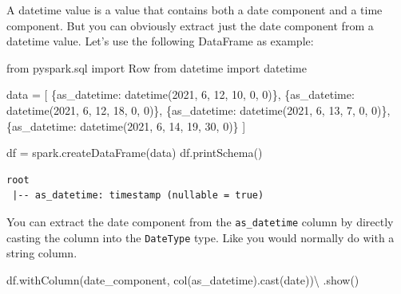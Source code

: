 \documentclass[
  11pt,
  letterpaper,
  DIV=11,
  numbers=noendperiod]{scrreprt}
\newenvironment{Shaded}{\begin{snugshade}}{\end{snugshade}}
\newcommand{\DecValTok}[1]{\textcolor[rgb]{0.68,0.00,0.00}{#1}}
\newcommand{\ImportTok}[1]{\textcolor[rgb]{0.00,0.46,0.62}{#1}}
\newcommand{\NormalTok}[1]{\textcolor[rgb]{0.00,0.23,0.31}{#1}}
\newcommand{\OperatorTok}[1]{\textcolor[rgb]{0.37,0.37,0.37}{#1}}
\newcommand{\StringTok}[1]{\textcolor[rgb]{0.13,0.47,0.30}{#1}}
\begin{document}
A datetime value is a value that contains both a date component and a
time component. But you can obviously extract just the date component
from a datetime value. Let's use the following DataFrame as example:

\begin{Shaded}
\begin{Highlighting}[]
\ImportTok{from}\NormalTok{ pyspark.sql }\ImportTok{import}\NormalTok{ Row}
\ImportTok{from}\NormalTok{ datetime }\ImportTok{import}\NormalTok{ datetime}

\NormalTok{data }\OperatorTok{=}\NormalTok{ [}
\NormalTok{    \{}\StringTok{\textquotesingle{}as\_datetime\textquotesingle{}}\NormalTok{: datetime(}\DecValTok{2021}\NormalTok{, }\DecValTok{6}\NormalTok{, }\DecValTok{12}\NormalTok{, }\DecValTok{10}\NormalTok{, }\DecValTok{0}\NormalTok{, }\DecValTok{0}\NormalTok{)\},}
\NormalTok{    \{}\StringTok{\textquotesingle{}as\_datetime\textquotesingle{}}\NormalTok{: datetime(}\DecValTok{2021}\NormalTok{, }\DecValTok{6}\NormalTok{, }\DecValTok{12}\NormalTok{, }\DecValTok{18}\NormalTok{, }\DecValTok{0}\NormalTok{, }\DecValTok{0}\NormalTok{)\},}
\NormalTok{    \{}\StringTok{\textquotesingle{}as\_datetime\textquotesingle{}}\NormalTok{: datetime(}\DecValTok{2021}\NormalTok{, }\DecValTok{6}\NormalTok{, }\DecValTok{13}\NormalTok{, }\DecValTok{7}\NormalTok{, }\DecValTok{0}\NormalTok{, }\DecValTok{0}\NormalTok{)\},}
\NormalTok{    \{}\StringTok{\textquotesingle{}as\_datetime\textquotesingle{}}\NormalTok{: datetime(}\DecValTok{2021}\NormalTok{, }\DecValTok{6}\NormalTok{, }\DecValTok{14}\NormalTok{, }\DecValTok{19}\NormalTok{, }\DecValTok{30}\NormalTok{, }\DecValTok{0}\NormalTok{)\}}
\NormalTok{]}

\NormalTok{df }\OperatorTok{=}\NormalTok{ spark.createDataFrame(data)}
\NormalTok{df.printSchema()}
\end{Highlighting}
\end{Shaded}

\begin{verbatim}
root
 |-- as_datetime: timestamp (nullable = true)
\end{verbatim}

You can extract the date component from the \texttt{as\_datetime} column
by directly casting the column into the \texttt{DateType} type. Like you
would normally do with a string column.

\begin{Shaded}
\begin{Highlighting}[]
\NormalTok{df.withColumn(}\StringTok{\textquotesingle{}date\_component\textquotesingle{}}\NormalTok{, col(}\StringTok{\textquotesingle{}as\_datetime\textquotesingle{}}\NormalTok{).cast(}\StringTok{\textquotesingle{}date\textquotesingle{}}\NormalTok{))}\OperatorTok{\textbackslash{}}
\NormalTok{    .show()}
\end{Highlighting}
\end{Shaded}
\end{document}
